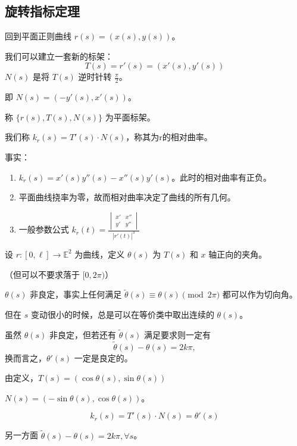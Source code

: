 \documentclass[lang=cn,10pt,thmcnt=section]{elegantbook}
\begin{document}
\subsection{旋转指标定理}
回到平面正则曲线 $r(s) = (x(s), y(s))$。

我们可以建立一套新的标架：
\[
T(s) = r'(s) = (x'(s), y'(s))
\]
$N(s)$ 是将 $T(s)$ 逆时针转 $\frac{\pi}{2}$。

即 $N(s) = (-y'(s), x'(s))$。

称 $\{r(s), T(s), N(s)\}$ 为平面标架。
\begin{definition}[相对曲率]
   
     我们称 $k_r(s) = T'(s) \cdot N(s)$，称其为r的相对曲率。
    \end{definition}
    
    事实：
    \begin{enumerate}
        \item $k_r(s) = x'(s) y''(s) - x''(s) y'(s)$。此时的相对曲率有正负。
        \item 平面曲线挠率为零，故而相对曲率决定了曲线的所有几何。
        \item 一般参数公式 $k_r(t) = \frac{\begin{vmatrix} x' & x'' \\ y' & y'' \end{vmatrix}}{|r'(t)|^3}$
    \end{enumerate}
\begin{definition}[切向角]
    设 $r: [0, \ell] \rightarrow \mathbb{E}^2$ 为曲线，定义 $\theta(s)$ 为 $T(s)$ 和 $x$ 轴正向的夹角。

（但可以不要求落于 $[0, 2\pi)$）
\end{definition}

\begin{remark}
    $\theta(s)$ 非良定，事实上任何满足 $\tilde{\theta}(s) \equiv \theta(s) \pmod{2\pi}$ 都可以作为切向角。

但在 $s$ 变动很小的时候，总是可以在等价类中取出连续的 $\theta(s)$。
\end{remark}

虽然 $\theta(s)$ 非良定，但若还有 $\tilde{\theta}(s)$ 满足要求则一定有
\[
\tilde{\theta}(s) - \theta(s) = 2k\pi,
\]
换而言之，$\theta'(s)$ 一定是良定的。

由定义，$T(s) = (\cos \theta(s), \sin \theta(s))$

$N(s) = (-\sin \theta(s), \cos \theta(s))$。

\[
k_r(s) = T'(s) \cdot N(s) = \theta'(s)
\]


另一方面 $\tilde{\theta}(s) - \theta(s) = 2k\pi, \forall s$。
\end{document}
